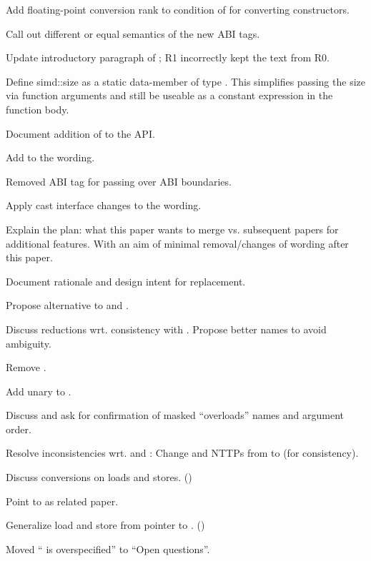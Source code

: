 \begin{revision}
\item Add floating-point conversion rank to condition of  for converting constructors.
\item Call out different or equal semantics of the new ABI tags.
\item Update introductory paragraph of ; R1 incorrectly kept the text from R0.
\item Define simd::size as a  static data-member of type . This simplifies passing the size via function arguments and still be useable as a constant expression in the function body.
\item Document addition of  to the API.
\item Add  to the wording.
\item Removed ABI tag for passing  over ABI boundaries.
\item Apply cast interface changes to the wording.
\item Explain the plan: what this paper wants to merge vs. subsequent papers for additional features. With an aim of minimal removal/changes of wording after this paper.
\item Document rationale and design intent for  replacement.
\end{revision}

\begin{revision}
\item Propose alternative to  and .
\item Discuss  reductions wrt. consistency with . Propose better names to avoid ambiguity.
\item Remove .
\item Add unary \code{\~{}} to .
\item Discuss and ask for confirmation of masked ``overloads'' names and argument order.
\item Resolve inconsistencies wrt.  and : Change  and  NTTPs from  to  (for consistency).
\item Discuss conversions on loads and stores. ()
\item Point to \cite{P2509R0} as related paper.
\item Generalize load and store from pointer to . ()
\item Moved `` is overspecified'' to ``Open questions''.
\end{revision}

